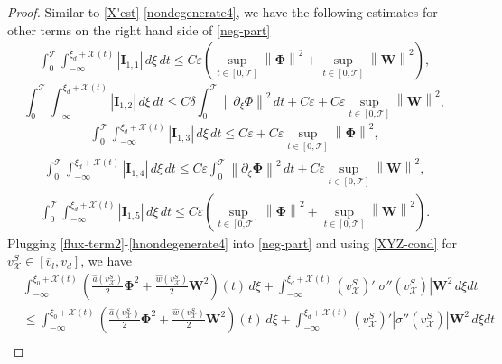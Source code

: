 \documentclass[10pt,a4paper]{amsart}
\def\T{\mathcal{T}}
\def\X{\mathcal{X}}
\def\avl{\overline{v}_l}
\def\ph{\mathbf{\Phi}}
\def\p{\partial}
\def\supt{\mathop{sup}\limits_{t \in [0,\mathcal{T}]}}
\def\vsx{v^S_{\mathcal{X}}}
\def\w{\mathbf{W}}
\newcommand{\norm}[1]{\left\lVert #1 \right\rVert}
\begin{document}
\begin{proof}
Similar to \eqref{X'est}-\eqref{nondegenerate4}, we have the following estimates for other terms on the right hand side of \eqref{neg-part}
	\begin{equation}\label{hX'est}
		\begin{aligned}
			\int_{0}^{\T}\int_{-\infty}^{\xi_{d}+\X(t)}|\mathbf{I}_{1,1}|\,d\xi\,dt\leq C\varepsilon(\supt\norm{\ph}^2+\supt\norm{\w}^2),
		\end{aligned}
	\end{equation}
	\begin{equation}\label{hnondegenerate1}
			\int_{0}^{\T} \int_{-\infty}^{\xi_{d}+\X(t)}|\mathbf{I}_{1,2}|\,d\xi\,dt\leq C\delta\int_{0}^{\T}\norm{\p_{\xi}\Phi}^2\,dt+C\varepsilon+C\varepsilon \supt\norm{\w}^2,
	\end{equation}
	\begin{equation}\label{hnondegenerate2}
		\begin{aligned}
			\int_{0}^{\T} \int_{-\infty}^{\xi_{d}+\X(t)}|\mathbf{I}_{1,3}|\,d\xi\,dt\leq C\varepsilon+C\varepsilon \supt\norm{\ph}^2,
		\end{aligned}
	\end{equation}
	\begin{equation}\label{hnondegenerate3}
		\begin{aligned}
			\int_{0}^{\T} \int_{-\infty}^{\xi_{d}+\X(t)}|\mathbf{I}_{1,4}|\,d\xi\,dt
			\leq C\varepsilon\int_{0}^{\T} \norm{\p_{\xi}\ph}^2 \,dt+C\varepsilon\supt\norm{\w}^2,
		\end{aligned}
	\end{equation}
	\begin{equation}\label{hnondegenerate4}
		\begin{aligned}
			\int_{0}^{\T} \int_{-\infty}^{\xi_{d}+\X(t)}|\mathbf{I}_{1,5}|\,d\xi\,dt\leq C\varepsilon(\supt\norm{\ph}^2+\supt\norm{\w}^2).
		\end{aligned}
	\end{equation}
	Plugging \eqref{flux-term2}-\eqref{hnondegenerate4} into \eqref{neg-part} and using \eqref{XYZ-cond} for $\vsx\in[\avl,v_d]$, we have
	\begin{equation}\label{neg-integral}
		\begin{aligned}
			&\int_{-\infty}^{\xi_{0}+\X(t)}\left(\frac{\hat{a}(\vsx)}{2}\ph^2+\frac{\hat{w}(\vsx)}{2}\w^2\right)(t)\,d\xi+\int_{-\infty}^{\xi_{d}+\X(t)}(\vsx)'|\sigma''(\vsx)|\w^2\,d\xi dt\\
			&\leq\int_{-\infty}^{\xi_{0}+\X(t)}\left(\frac{\hat{a}(\vsx)}{2}\ph^2+\frac{\hat{w}(\vsx)}{2}\w^2\right)(t)\,d\xi+\int_{-\infty}^{\xi_{d}+\X(t)}(\vsx)'|\sigma''(\vsx)|\w^2\,d\xi dt\\

\end{aligned}
\end{equation}
\end{proof}
\end{document}
